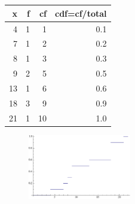 \documentclass[twocolumn]{article}
\newcommand{\setsection}[1]{\setcounter{section}{#1}\addtocounter{section}{-1}\section{}}
\begin{document}
\setsection{15}
\begin{table}[h]
\centering
\begin{tabular}{@{}rrrr@{}}
\toprule
x  & f & cf & cdf=cf/total \\ \midrule
4  & 1 & 1  & 0.1          \\
7  & 1 & 2  & 0.2          \\
8  & 1 & 3  & 0.3          \\
9  & 2 & 5  & 0.5          \\
13 & 1 & 6  & 0.6          \\
18 & 3 & 9  & 0.9          \\
21 & 1 & 10 & 1.0          \\ \bottomrule
\end{tabular}
\end{table}
\begin{figure}[!ht]
\centering
\includegraphics[width=0.4\textwidth]{15b.pdf}
\end{figure}

\setsection{17}
\end{document}
